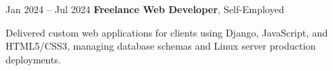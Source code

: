 \begin{twocolentry}{
        Jan 2024 – Jul 2024
    }
\textbf{Freelance Web Developer}, Self-Employed\end{twocolentry}

\vspace{0.10 cm}
\begin{onecolentry}
    \begin{highlights}
        \item Delivered custom web applications for clients using Django, JavaScript, and HTML5/CSS3, managing database schemas and Linux server production deployments.
    \end{highlights}
\end{onecolentry}
